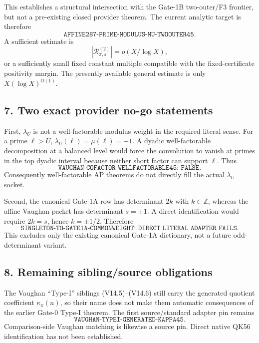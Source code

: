 This establishes a structural intersection with the Gate-1B two-outer/F3 frontier, but not a pre-existing
closed provider theorem.  The current analytic target is therefore
\[
\boxed{\texttt{AFFINE287-PRIME-MODULUS-MU-TWOOUTER45}.}
\tag{V14.19}
\]
A sufficient estimate is
\[
\boxed{|\mathcal R^{(2)}_{\pi,s}|=o(X/\log X),}
\tag{V14.20}
\]
or a sufficiently small fixed constant multiple compatible with the fixed-certificate positivity margin.
The presently available general estimate is only $X(\log X)^{O(1)}$.

\subsection*{7. Two exact provider no-go statements}
First, $\lambda_U$ is not a well-factorable modulus weight in the required literal sense.  For a prime
$\ell>U$, $\lambda_U(\ell)=\mu(\ell)=-1$.  A dyadic well-factorable decomposition at a balanced level would
force the convolution to vanish at primes in the top dyadic interval because neither short factor can support
$\ell$.  Thus
\[
\boxed{\texttt{VAUGHAN-COFACTOR-WELLFACTORABLE45: FALSE}.}
\tag{V14.21}
\]
Consequently well-factorable AP theorems do not directly fill the actual $\lambda_U$ socket.

Second, the canonical Gate-1A row has determinant $2k$ with $k\in\mathbb Z$, whereas the affine Vaughan packet
has determinant $s=\pm1$.  A direct identification would require $2k=s$, hence $k=\pm1/2$.  Therefore
\[
\boxed{\texttt{SINGLETON-TO-GATE1A-COMMONWEIGHT: DIRECT\ LITERAL\ ADAPTER\ FAILS}.}
\tag{V14.22}
\]
This excludes only the existing canonical Gate-1A dictionary, not a future odd-determinant variant.

\subsection*{8. Remaining sibling/source obligations}
The Vaughan ``Type-I'' siblings (V14.5)--(V14.6) still carry the generated quotient coefficient
$\kappa_\pi(n)$, so their name does not make them automatic consequences of the earlier Gate-0 Type-I theorem.
The first source/standard adapter pin remains
\[
\boxed{\texttt{VAUGHAN-TYPEI-GENERATED-KAPPA45}.}
\tag{V14.23}
\]
Comparison-side Vaughan matching is likewise a source pin.  Direct native QK56 identification has not been
established.

